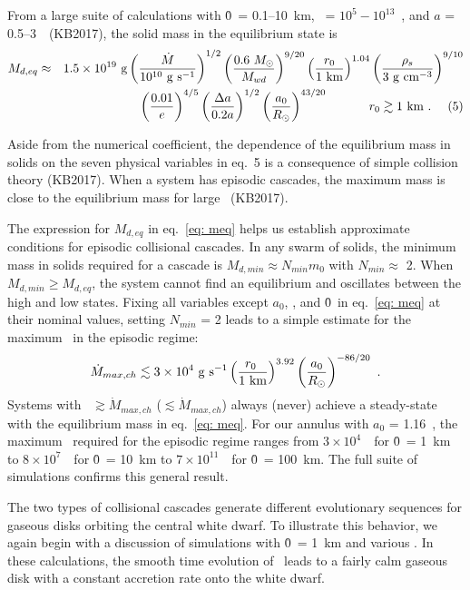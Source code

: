 \documentclass[12pt,preprint]{aastex}
\begin{document}
From a large suite of calculations with \r0\ = 0.1--10~km, \mdotz\ = $10^5 - 10^{13}$~\gs,
and $a$ = 0.5--3~\rsun\ (KB2017), the solid mass in the equilibrium state is 
\begin{eqnarray*}
M_{d, eq} & \approx & 1.5 \times 10^{19}~{\rm g} 
\left ( { \dot{M} \over 10^{10}~{\rm g~s^{-1}} } \right )^{1/2}
\left ( { 0.6~\msun \over \mwd } \right )^{9/20}
\left ( { \r0 \over {\rm 1~km} } \right )^{1.04}
\left ( { \rho_s \over {\rm 3~g~cm^{-3}} } \right )^{9/10} \\
 & & ~~~~~~~~~~~~~~~~\left ( { 0.01 \over e } \right )^{4/5}
\left ( { \Delta a } \over {0.2 a} \right )^{1/2}
\left ( { a_0 \over \rsun } \right )^{43/20} ~~~~~~~~~~ \r0 \gtrsim {\rm 1~km} ~ . ~~~~ (5)
\label{eq: meq}
\end{eqnarray*}
\addtocounter{equation}{1}
Aside from the numerical coefficient, the dependence of the equilibrium mass in solids on 
the seven physical variables in eq.~5 is a consequence of simple collision theory (KB2017).
When a system has episodic cascades, the maximum mass is close to the equilibrium mass for 
large \mdotz\ (KB2017).

The expression for $M_{d, eq}$ in eq.~\ref{eq: meq} helps us establish approximate 
conditions for episodic collisional cascades.  In any swarm of solids, the minimum mass in 
solids required for a cascade is $M_{d, min} \approx N_{min} m_0$ with $N_{min} \approx$ 2. 
When $M_{d, min} \ge M_{d, eq}$, the system cannot find an equilibrium and oscillates 
between the high and low states.  Fixing all variables except $a_0$, \mdotz, and \r0\ in 
eq.~\ref{eq: meq} at their nominal values, setting $N_{min}$ = 2 leads to a simple 
estimate for the maximum \mdotz\ in the episodic regime:
\begin{equation}
\dot{M}_{max, ch} \lesssim 3 \times 10^4~{\rm g~s^{-1}} 
\left ( { \r0\ \over {\rm 1~km} } \right )^{3.92} 
\left ( { a_0 \over \rsun } \right )^{-86/20} ~ .
\label{eq: mdotmax} 
\end{equation}
Systems with \mdotz\ $\gtrsim \dot{M}_{max, ch}$ ($\lesssim \dot{M}_{max, ch}$) always
(never) achieve a steady-state with the equilibrium mass in eq.~\ref{eq: meq}.  For our 
annulus with $a_0$ = 1.16~\rsun, the maximum \mdotz\ required for the episodic regime 
ranges from $3 \times 10^4$~\gs\ for \r0\ = 1~km to $8 \times 10^7$~\gs\ for \r0\ = 10~km to 
$7 \times 10^{11}$~\gs\ for \r0\ = 100~km. The full suite of simulations confirms 
this general result.

The two types of collisional cascades generate different evolutionary sequences for 
gaseous disks orbiting the central white dwarf. To illustrate this behavior, we again 
begin with a discussion of simulations with \r0\ = 1~km and various \mdotz. In these
calculations, the smooth time evolution of \mdotv\ leads to a fairly calm gaseous disk 
with a constant accretion rate onto the white dwarf.
\end{document}
